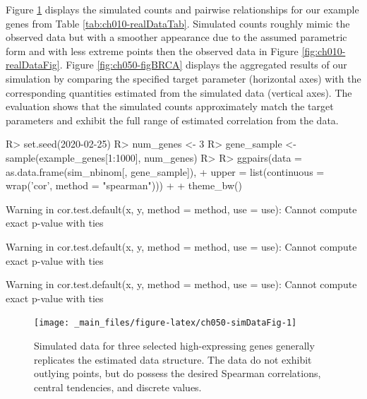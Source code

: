 \documentclass[
]{jss}
\begin{document}
\begin{CodeChunk}
\end{CodeChunk}

Figure \ref{fig:ch050-simDataFig} displays the simulated counts and pairwise relationships for our example genes from Table \ref{tab:ch010-realDataTab}.
Simulated counts roughly mimic the observed data but with a smoother appearance due to the assumed parametric form and with less extreme points then the observed data in Figure \ref{fig:ch010-realDataFig}. Figure \ref{fig:ch050-figBRCA} displays the aggregated results of our simulation by comparing the specified target parameter (horizontal axes) with the corresponding quantities estimated from the simulated data (vertical axes). The evaluation shows that the simulated counts approximately match the target parameters and exhibit the full range of estimated correlation from the data.

\begin{CodeChunk}
\begin{CodeInput}
R> set.seed(2020-02-25)
R> num_genes <- 3
R> gene_sample <- sample(example_genes[1:1000], num_genes)
R> 
R> ggpairs(data = as.data.frame(sim_nbinom[, gene_sample]),
+         upper = list(continuous = wrap('cor', method = "spearman"))) + 
+   theme_bw()
\end{CodeInput}
\begin{CodeOutput}
Warning in cor.test.default(x, y, method = method, use = use): Cannot compute
exact p-value with ties
\end{CodeOutput}
\begin{CodeOutput}
Warning in cor.test.default(x, y, method = method, use = use): Cannot compute
exact p-value with ties
\end{CodeOutput}
\begin{CodeOutput}
Warning in cor.test.default(x, y, method = method, use = use): Cannot compute
exact p-value with ties
\end{CodeOutput}
\begin{figure}

{\centering \texttt{[image: \_main\_files/figure-latex/ch050-simDataFig-1]} 

}

\caption[Simulated data for three selected high-expressing genes generally replicates the estimated data structure]{Simulated data for three selected high-expressing genes generally replicates the estimated data structure. The data do not exhibit outlying points, but do possess the desired Spearman correlations, central tendencies, and discrete values.}\label{fig:ch050-simDataFig}
\end{figure}
\end{CodeChunk}
\end{document}
